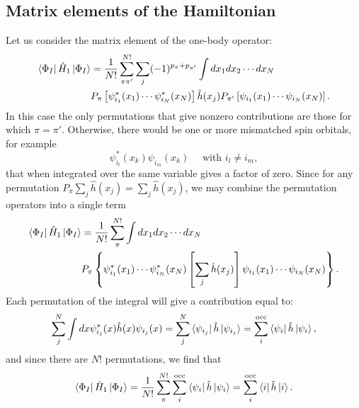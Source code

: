 \documentclass[../Main/chem532-notes.tex]{subfiles}
\begin{document}
\subsection{Matrix elements of the Hamiltonian}
Let us consider the matrix element of the one-body operator:
\begin{equation}
\begin{split}
\bra{\Phi_I} \hat{H}_1 \ket{\Phi_I} &= \frac{1}{N!}
\sum_{\pi \pi'}^{N!} \sum_j (-1)^{p_\pi + p_{\pi'}} \int dx_1 dx_2 \cdots dx_N \\
&
P_{\pi}\left[
\psi_{i_1}^{*}(x_1) \cdots \psi_{i_N}^{*}(x_N)
\right]
\hat{h}(x_j)
P_{\pi'}\left[
\psi_{i_1}(x_1) \cdots \psi_{i_N}(x_N)
\right].
\end{split}
\end{equation}
In this case the only permutations that give nonzero contributions are those for which $\pi = \pi'$.
Otherwise, there would be one or more mismatched spin orbitals, for example
\begin{equation}
\psi_{i_l}^{*}(x_k) \psi_{i_m}(x_k) \quad \text{ with } i_l \neq i_m,
\end{equation}
that when integrated over the same variable gives a factor of zero.
Since for any permutation $P_{\pi} \sum_j\hat{h}(x_j) = \sum_j\hat{h}(x_j)$, we may combine the permutation operators into a single term
\begin{equation}
\begin{split}
\bra{\Phi_I} \hat{H}_1 \ket{\Phi_I} &= \frac{1}{N!}
\sum_{\pi}^{N!} \int dx_1 dx_2 \cdots dx_N \\
&
P_{\pi}\left\{
\psi_{i_1}^{*}(x_1) \cdots \psi_{i_N}^{*}(x_N)
\left[\sum_j\hat{h}(x_j)\right]
\psi_{i_1}(x_1) \cdots \psi_{i_N}(x_N)
\right\}.
\end{split}
\end{equation}
Each permutation of the integral will give a contribution equal to:
\begin{equation}
\sum_j^{N} \int dx \psi_{i_j}^{*}(x) \hat{h}(x) \psi_{i_j}(x) 
= \sum_j^{N} \bra{\psi_{i_j}} \hat{h} \ket{\psi_{i_j}} = \sum_i^{\rm occ} \bra{\psi_i}\hat{h}\ket{\psi_i},
\end{equation}
and since there are $N!$ permutations, we find that 
\begin{equation}
\bra{\Phi_I} \hat{H}_1 \ket{\Phi_I} = \frac{1}{N!}
\sum_{\pi}^{N!}   \sum_i^{\rm occ} \bra{\psi_i}\hat{h}\ket{\psi_i} =  \sum_i^{\rm occ} \bra{i}\hat{h}\ket{i}.
\end{equation}
\end{document}

